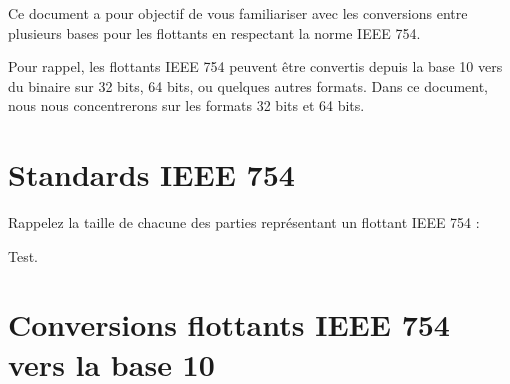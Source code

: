 \documentclass[11pt,a4paper]{article}
\begin{document}
\EncadreTitre

\bigskip


%
%

\bigskip


Ce document a pour objectif de vous familiariser avec les conversions entre plusieurs bases pour les flottants en respectant la norme IEEE 754.

\bigskip

Pour rappel, les flottants IEEE 754 peuvent être convertis depuis la base 10 vers du binaire sur 32 bits, 64 bits, ou quelques autres formats.
Dans ce document, nous nous concentrerons sur les formats 32 bits et 64 bits.

\bigskip


\section{Standards IEEE 754}


\medskip

Rappelez la taille de chacune des parties représentant un flottant IEEE 754 :

\medskip

\begin{center}

Test.

\end{center}


\section{Conversions flottants IEEE 754 vers la base 10}
\end{document}
